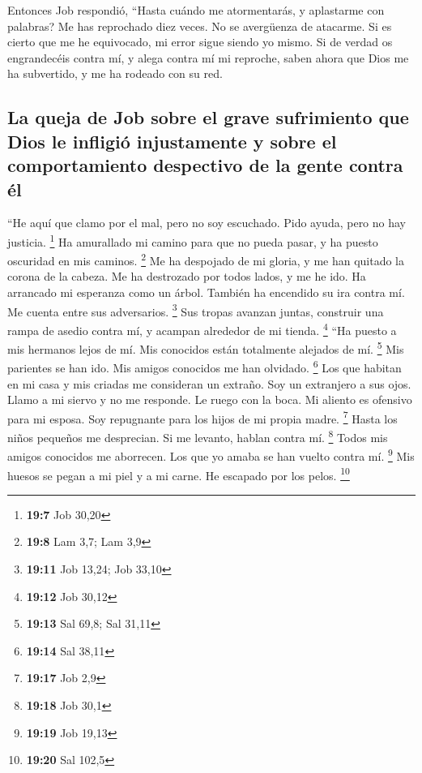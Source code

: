  Entonces Job respondió,  ``Hasta cuándo me
atormentarás, y aplastarme con palabras?  Me has
reprochado diez veces. No se avergüenza de atacarme.  Si
es cierto que me he equivocado, mi error sigue siendo yo mismo.
 Si de verdad os engrandecéis contra mí, y alega contra mí
mi reproche,  saben ahora que Dios me ha subvertido, y me
ha rodeado con su red.

\hypertarget{la-queja-de-job-sobre-el-grave-sufrimiento-que-dios-le-infligiuxf3-injustamente-y-sobre-el-comportamiento-despectivo-de-la-gente-contra-uxe9l}{%
\subsection{La queja de Job sobre el grave sufrimiento que Dios le
infligió injustamente y sobre el comportamiento despectivo de la gente
contra
él}\label{la-queja-de-job-sobre-el-grave-sufrimiento-que-dios-le-infligiuxf3-injustamente-y-sobre-el-comportamiento-despectivo-de-la-gente-contra-uxe9l}}

 ``He aquí que clamo por el mal, pero no soy escuchado.
Pido ayuda, pero no hay justicia. \footnote{\textbf{19:7} Job 30,20}
 Ha amurallado mi camino para que no pueda pasar, y ha
puesto oscuridad en mis caminos. \footnote{\textbf{19:8} Lam 3,7; Lam
  3,9}  Me ha despojado de mi gloria, y me han quitado la
corona de la cabeza.  Me ha destrozado por todos lados, y
me he ido. Ha arrancado mi esperanza como un árbol. 
También ha encendido su ira contra mí. Me cuenta entre sus adversarios.
\footnote{\textbf{19:11} Job 13,24; Job 33,10}  Sus
tropas avanzan juntas, construir una rampa de asedio contra mí, y
acampan alrededor de mi tienda. \footnote{\textbf{19:12} Job 30,12}
 ``Ha puesto a mis hermanos lejos de mí. Mis conocidos
están totalmente alejados de mí. \footnote{\textbf{19:13} Sal 69,8; Sal
  31,11}  Mis parientes se han ido. Mis amigos conocidos
me han olvidado. \footnote{\textbf{19:14} Sal 38,11}  Los
que habitan en mi casa y mis criadas me consideran un extraño. Soy un
extranjero a sus ojos.  Llamo a mi siervo y no me
responde. Le ruego con la boca.  Mi aliento es ofensivo
para mi esposa. Soy repugnante para los hijos de mi propia madre.
\footnote{\textbf{19:17} Job 2,9}  Hasta los niños
pequeños me desprecian. Si me levanto, hablan contra mí. \footnote{\textbf{19:18}
  Job 30,1}  Todos mis amigos conocidos me aborrecen. Los
que yo amaba se han vuelto contra mí. \footnote{\textbf{19:19} Job 19,13}
 Mis huesos se pegan a mi piel y a mi carne. He escapado
por los pelos. \footnote{\textbf{19:20} Sal 102,5}

